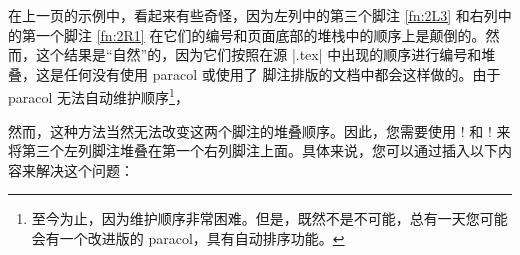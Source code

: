 在上一页的示例中，看起来有些奇怪，因为左列中的第三个脚注 \ref{fn:2L3} 和右列中的第一个脚注 \ref{fn:2R1} 在它们的编号和页面底部的堆栈中的顺序上是颠倒的。然而，这个结果是“自然”的，因为它们按照在源 |.tex| 中出现的顺序进行编号和堆叠，这是任何没有使用 \textsf{paracol} 或使用了 \mcfnote{} 脚注排版的文档中都会这样做的。由于 \textsf{paracol} 无法自动维护顺序\footnote{至今为止，因为维护顺序非常困难。但是，既然不是不可能，总有一天您可能会有一个改进版的 \textsf{paracol}，具有自动排序功能。}，




% 

然而，这种方法当然无法改变这两个脚注的堆叠顺序。因此，您需要使用 \!\footnotemark! 和  \!\footnotetext! 来将第三个左列脚注堆叠在第一个右列脚注上面。具体来说，您可以通过插入以下内容来解决这个问题：

